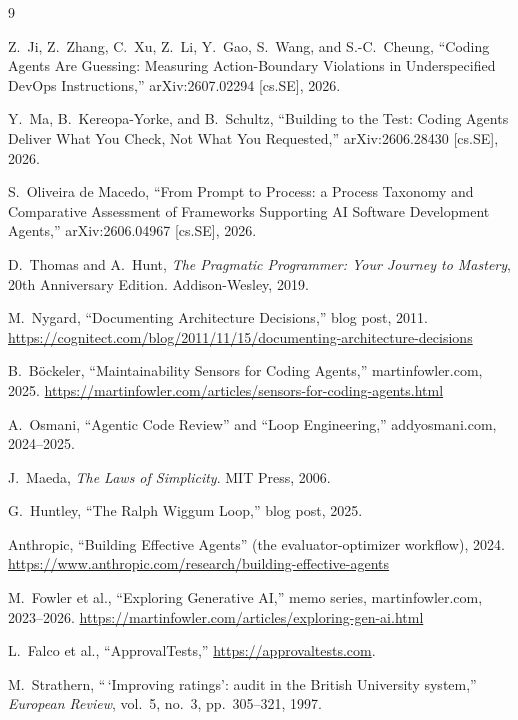 \documentclass[11pt]{article}
\begin{document}
\begin{thebibliography}{9}

Z.~Ji, Z.~Zhang, C.~Xu, Z.~Li, Y.~Gao, S.~Wang, and S.-C.~Cheung,
``Coding Agents Are Guessing: Measuring Action-Boundary Violations in
Underspecified DevOps Instructions,'' arXiv:2607.02294 [cs.SE], 2026.

Y.~Ma, B.~Kereopa-Yorke, and B.~Schultz,
``Building to the Test: Coding Agents Deliver What You Check, Not What You
Requested,'' arXiv:2606.28430 [cs.SE], 2026.

S.~Oliveira de Macedo,
``From Prompt to Process: a Process Taxonomy and Comparative Assessment of
Frameworks Supporting AI Software Development Agents,''
arXiv:2606.04967 [cs.SE], 2026.

D.~Thomas and A.~Hunt,
\emph{The Pragmatic Programmer: Your Journey to Mastery}, 20th Anniversary
Edition. Addison-Wesley, 2019.

M.~Nygard, ``Documenting Architecture Decisions,'' blog post, 2011.
\url{https://cognitect.com/blog/2011/11/15/documenting-architecture-decisions}

B.~B\"ockeler, ``Maintainability Sensors for Coding Agents,''
martinfowler.com, 2025.
\url{https://martinfowler.com/articles/sensors-for-coding-agents.html}

A.~Osmani, ``Agentic Code Review'' and ``Loop Engineering,'' addyosmani.com,
2024--2025.

J.~Maeda, \emph{The Laws of Simplicity}. MIT Press, 2006.

G.~Huntley, ``The Ralph Wiggum Loop,'' blog post, 2025.

Anthropic, ``Building Effective Agents'' (the evaluator-optimizer workflow),
2024. \url{https://www.anthropic.com/research/building-effective-agents}

M.~Fowler et al., ``Exploring Generative AI,'' memo series,
martinfowler.com, 2023--2026.
\url{https://martinfowler.com/articles/exploring-gen-ai.html}

L.~Falco et al., ``ApprovalTests,'' \url{https://approvaltests.com}.

M.~Strathern, ``\,`Improving ratings': audit in the British University
system,'' \emph{European Review}, vol.~5, no.~3, pp.~305--321, 1997.


\end{thebibliography}
\end{document}
